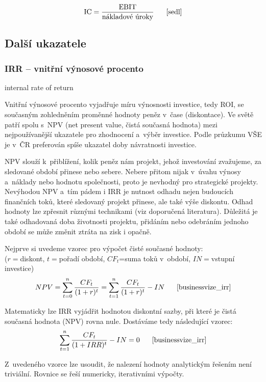 $$\vz{IC}{EBIT}{nákladové úroky} \scite{sedl}$$








\subsection{Další ukazatele}

\subsubsection{IRR -- vnitřní výnosové procento}
internal rate of return

Vnitřní výnosové procento vyjadřuje míru výnosnosti investice, tedy ROI, se současným zohledněním proměnné hodnoty peněz v~čase (diskontace). Ve světě patří spolu s~NPV (net present value, čistá současná hodnota) mezi nejpoužívanější ukazatele pro zhodnocení a~výběr investice. Podle průzkumu VŠE je v~ČR preferován spíše ukazatel doby návratnosti investice\cite{businessvize_irr}.

NPV slouží k~přiblížení, kolik peněz nám projekt, jehož investování zvažujeme, za sledované období přinese nebo sebere. Nebere přitom nijak v~úvahu výnosy a~náklady nebo hodnotu společnosti, proto je nevhodný pro strategické projekty. Nevýhodou NPV a~tím pádem i IRR je nutnost odhadu nejen budoucích finančních toků, které sledovaný projekt přinese, ale také výše diskontu. Odhad hodnoty lze zpřesnit různými technikami (viz doporučená literatura). Důležitá je také odhadovaná doba životnosti projektu, přidáním nebo odebráním jednoho období se může změnit ztráta na zisk i opačně.

Nejprve si uvedeme vzorec pro výpočet čisté současné hodnoty: 
\\($r=$diskont, $t=$pořadí období, $CF_t$=suma toků v~období, $IN=$vstupní investice)
$$NPV=\sum\limits_{t=0}^{n} \dfrac{CF_t}{(1+r)^t} = \sum\limits_{t=1}^{n} \dfrac{CF_t}{(1+r)^t} - IN\scite{businessvize_irr}$$

Matematicky lze IRR vyjádřit hodnotou diskontní sazby, při které je čistá současná hodnota (NPV) rovna nule. Dostáváme tedy následující vzorec:
$$\sum\limits_{t=1}^{n} \dfrac{CF_t}{(1+IRR)^t} - IN = 0 \scite{businessvize_irr}$$

Z~uvedeného vzorce lze usoudit, že nalezení hodnoty analytickým řešením není triviální. Rovnice se řeší numericky, iterativními výpočty.





































